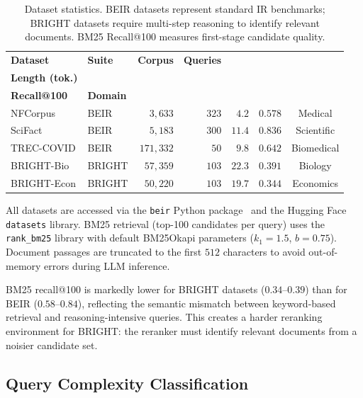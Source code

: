 \documentclass[12pt]{article}
\begin{document}
\begin{table}[htbp]
\caption{Dataset statistics.  BEIR datasets represent standard IR benchmarks;
         BRIGHT datasets require multi-step reasoning to identify relevant
         documents.  BM25 Recall@100 measures first-stage candidate quality.}
\label{tab:datasets}
\centering
\small
\setlength{\tabcolsep}{6pt}
\renewcommand{\arraystretch}{1.3}
\begin{tabular}{@{}llrrrrc@{}}
\toprule
\textbf{Dataset} & \textbf{Suite} &
\textbf{Corpus} & \textbf{Queries} &
\makecell{\textbf{Avg.~Query}\\\textbf{Length (tok.)}} &
\makecell{\textbf{BM25}\\\textbf{Recall@100}} &
\textbf{Domain} \\
\midrule
NFCorpus    & BEIR   & $3{,}633$   & $323$ & $4.2$  & $0.578$ & Medical \\
SciFact     & BEIR   & $5{,}183$   & $300$ & $11.4$ & $0.836$ & Scientific \\
TREC-COVID  & BEIR   & $171{,}332$ & $50$  & $9.8$  & $0.642$ & Biomedical \\
BRIGHT-Bio  & BRIGHT & $57{,}359$  & $103$ & $22.3$ & $0.391$ & Biology \\
BRIGHT-Econ & BRIGHT & $50{,}220$  & $103$ & $19.7$ & $0.344$ & Economics \\
\bottomrule
\end{tabular}
\end{table}

All datasets are accessed via the \texttt{beir} Python package~\citep{thakur2021beir}
and the Hugging Face \texttt{datasets} library.  BM25 retrieval (top-100 candidates
per query) uses the \texttt{rank\_bm25} library with default BM25Okapi parameters
($k_1=1.5$, $b=0.75$).  Document passages are truncated to the first $512$
characters to avoid out-of-memory errors during LLM inference.

BM25 recall@100 is markedly lower for BRIGHT datasets ($0.34$--$0.39$) than
for BEIR ($0.58$--$0.84$), reflecting the semantic mismatch between
keyword-based retrieval and reasoning-intensive queries.  This creates a harder
reranking environment for BRIGHT: the reranker must identify relevant documents
from a noisier candidate set.

\subsection{Query Complexity Classification}
\label{sec:complexity}
\end{document}

